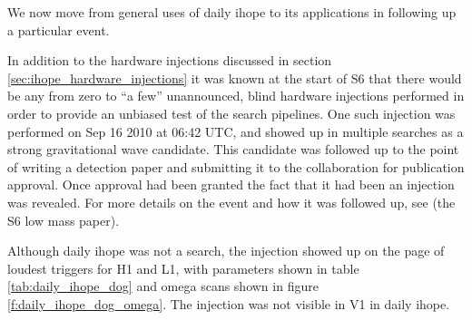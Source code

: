 We now move from general uses of daily ihope to its applications in
following up a particular event.

In addition to the hardware injections discussed in section
\ref{sec:ihope_hardware_injections} it was known at the start of S6
that there would be any from zero to ``a few'' unannounced, blind
hardware injections performed in order to provide an unbiased test of
the search pipelines.  One such injection was performed on Sep 16
2010 at 06:42 UTC, and showed up in multiple searches as a strong
gravitational wave candidate.  This candidate was followed up to the
point of writing a detection paper and submitting it to the
collaboration for publication approval.  Once approval had been
granted the fact that it had been an injection was revealed.  For more
details on the event and how it was followed up, see (the S6 low mass
paper).

Although daily ihope was not a search, the injection showed up on the
page of loudest triggers for H1 and L1, with parameters shown in table
\ref{tab:daily_ihope_dog} and omega scans shown in figure
\ref{f:daily_ihope_dog_omega}.  The injection was not visible in V1 in
daily ihope.

